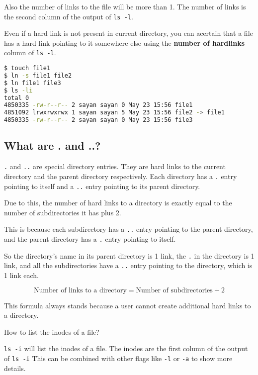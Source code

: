 Also the number of links to the file will be more than 1.
The number of links is the second
column of the output of \lstinline|ls -l|.

Even if a hard link is not present in current directory, you can acertain that a file has a hard link pointing to it somewhere else using the \textbf{number of hardlinks} column of \lstinline|ls -l|.

\begin{lstlisting}[language=bash]
$ touch file1
$ ln -s file1 file2
$ ln file1 file3
$ ls -li
total 0
4850335 -rw-r--r-- 2 sayan sayan 0 May 23 15:56 file1
4851092 lrwxrwxrwx 1 sayan sayan 5 May 23 15:56 file2 -> file1
4850335 -rw-r--r-- 2 sayan sayan 0 May 23 15:56 file3
\end{lstlisting}

\subsection{What are . and ..?}

\lstinline|.| and \lstinline|..| are special directory entries.
They are hard links to the current directory and the parent directory respectively.
Each directory has a \lstinline|.| entry pointing to itself and a \lstinline|..| entry pointing to its parent directory.

Due to this, the number of hard links to a directory is exactly equal to the number of subdirectories it has plus 2.

This is because each subdirectory has a \lstinline|..| entry pointing to the parent directory, and the parent directory has a \lstinline|.| entry pointing to itself.

So the directory's name in its parent directory is 1 link,
the \lstinline|.| in the directory is 1 link,
and all the subdirectories have a \lstinline|..| entry pointing to the directory, which is 1 link each.

\[
  \text{Number of links to a directory} = \text{Number of subdirectories} + 2
\]

This formula always stands because a user cannot create additional hard links to a directory.





\begin{qs}
  How to list the inodes of a file?
\end{qs}

\begin{ans}
  \lstinline|ls -i| will list the inodes of a file.
  The inodes are the first column of the output of \lstinline|ls -i|
  This can be combined with other flags like \lstinline|-l| or \lstinline|-a| to show more details.
\end{ans}

